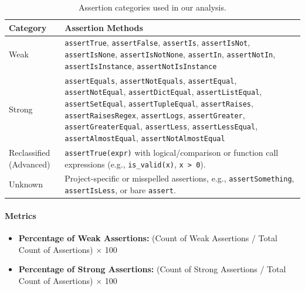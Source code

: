 \documentclass[conference]{IEEEtran}
\begin{document}
\begin{table}[t]
\centering
\caption{Assertion categories used in our analysis.}
\begin{tabular}{p{2.1cm} p{5.9cm}}
\toprule
\textbf{Category} & \textbf{Assertion Methods} \\
\midrule

Weak &
\texttt{assertTrue},
\texttt{assertFalse},
\texttt{assertIs},
\texttt{assertIsNot},
\texttt{assertIsNone},
\texttt{assertIsNotNone},
\texttt{assertIn},
\texttt{assertNotIn},
\texttt{assertIsInstance},
\texttt{assertNotIsInstance} \\

\midrule

Strong &
\texttt{assertEquals},
\texttt{assertNotEquals},
\texttt{assertEqual},
\texttt{assertNotEqual},
\texttt{assertDictEqual},
\texttt{assertListEqual},
\texttt{assertSetEqual},
\texttt{assertTupleEqual},
\texttt{assertRaises},
\texttt{assertRaisesRegex},
\texttt{assertLogs},
\texttt{assertGreater},
\texttt{assertGreaterEqual},
\texttt{assertLess},
\texttt{assertLessEqual},
\texttt{assertAlmostEqual},
\texttt{assertNotAlmostEqual} \\

\midrule

Reclassified (Advanced) &
\texttt{assertTrue(expr)} with logical/comparison or function call expressions (e.g., \texttt{is\_valid(x)}, \texttt{x > 0}). \\

\midrule

Unknown &
Project-specific or misspelled assertions, e.g., \texttt{assertSomething}, \texttt{assertIsLess}, or bare \texttt{assert}. \\

\bottomrule
\end{tabular}
\label{tab:assertion-taxonomy-actual}
\end{table}




\paragraph{\textbf{Metrics}}
\begin{itemize}
    \item \textbf{Percentage of Weak Assertions:}
    (Count of Weak Assertions / Total Count of Assertions) $\times$ 100
    \item \textbf{Percentage of Strong Assertions:}
    (Count of Strong Assertions / Total Count of Assertions) $\times$ 100
\end{itemize}
\end{document}
